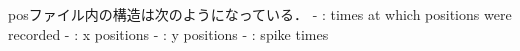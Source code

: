 posファイル内の構造は次のようになっている．
- : times at which positions were recorded
- : x positions
- : y positions
- : spike times